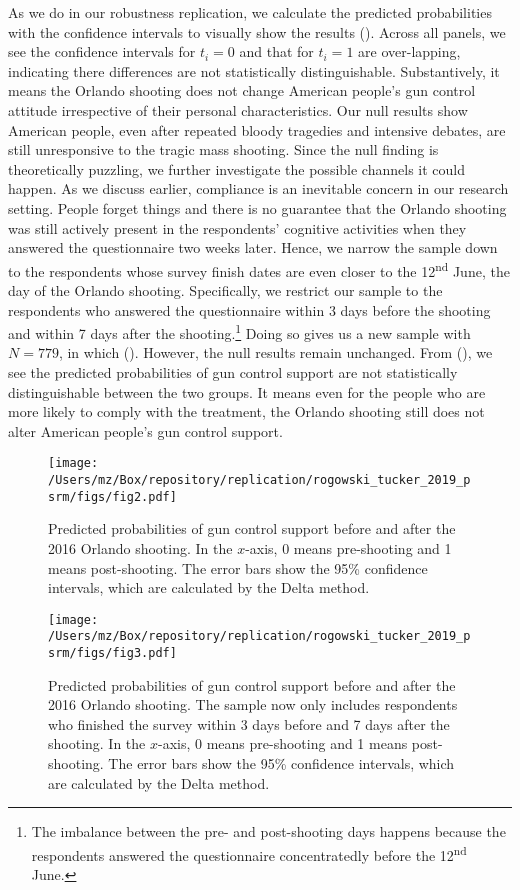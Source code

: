 \documentclass[11pt]{article}
\begin{document}
As we do in our robustness replication, we calculate the predicted probabilities with the confidence intervals to visually show the results (). Across all panels, we see the confidence intervals for \(t_i = 0\) and that for \(t_i = 1\) are over-lapping, indicating there differences are not statistically distinguishable. Substantively, it means the Orlando shooting does not change American people’s gun control attitude irrespective of their personal characteristics. Our null results show American people, even after repeated bloody tragedies and intensive debates, are still unresponsive to the tragic mass shooting. Since the null finding is theoretically puzzling, we further investigate the possible channels it could happen. As we discuss earlier, compliance is an inevitable concern in our research setting. People forget things and there is no guarantee that the Orlando shooting was still actively present in the respondents’ cognitive activities when they answered the questionnaire two weeks later. Hence, we narrow the sample down to the respondents whose survey finish dates are even closer to the 12\textsuperscript{nd} June, the day of the Orlando shooting. Specifically, we restrict our sample to the respondents who answered the questionnaire within 3 days before the shooting and within 7 days after the shooting.\footnote{The imbalance between the pre- and post-shooting days happens because the respondents answered the questionnaire concentratedly before the 12\textsuperscript{nd} June.} Doing so gives us a new sample with \(N = 779\), in which (). However, the null results remain unchanged. From (), we see the predicted probabilities of gun control support are not statistically distinguishable between the two groups. It means even for the people who are more likely to comply with the treatment, the Orlando shooting still does not alter American people’s gun control support.
\begin{figure}[htbp!]
    \centering
    \texttt{[image: /Users/mz/Box/repository/replication/rogowski\_tucker\_2019\_psrm/figs/fig2.pdf]}
    \captionsetup{justification = raggedright, singlelinecheck = false}
    \caption{Predicted probabilities of gun control support before and after the 2016 Orlando shooting. In the \(x\)-axis, 0 means pre-shooting and 1 means post-shooting. The error bars show the 95\% confidence intervals, which are calculated by the Delta method.}\label{fig2}
\end{figure}
\begin{figure}[htbp!]
    \centering
    \texttt{[image: /Users/mz/Box/repository/replication/rogowski\_tucker\_2019\_psrm/figs/fig3.pdf]}
    \captionsetup{justification = raggedright, singlelinecheck = false}
    \caption{Predicted probabilities of gun control support before and after the 2016 Orlando shooting. The sample now only includes respondents who finished the survey within 3 days before and 7 days after the shooting. In the \(x\)-axis, 0 means pre-shooting and 1 means post-shooting. The error bars show the 95\% confidence intervals, which are calculated by the Delta method.}\label{fig3}
\end{figure}
\end{document}
